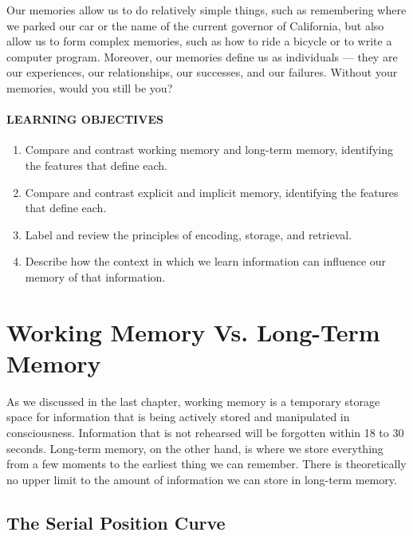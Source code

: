 \documentclass[
]{krantz}
\providecommand{\tightlist}{%
  \setlength{\itemsep}{0pt}\setlength{\parskip}{0pt}}
\begin{document}
Our memories allow us to do relatively simple things, such as remembering where we parked our car or the name of the current governor of California, but also allow us to form complex memories, such as how to ride a bicycle or to write a computer program. Moreover, our memories define us as individuals --- they are our experiences, our relationships, our successes, and our failures. Without your memories, would you still be you?

\hypertarget{learning-objectives-4}{%
\paragraph*{LEARNING OBJECTIVES}\label{learning-objectives-4}}

\begin{enumerate}
\def\labelenumi{\arabic{enumi}.}
\tightlist
\item
  Compare and contrast working memory and long-term memory, identifying the features that define each.
\item
  Compare and contrast explicit and implicit memory, identifying the features that define each.
\item
  Label and review the principles of encoding, storage, and retrieval.
\item
  Describe how the context in which we learn information can influence our memory of that information.
\end{enumerate}

\hypertarget{working-memory-vs.-long-term-memory}{%
\section{Working Memory Vs. Long-Term Memory}\label{working-memory-vs.-long-term-memory}}

As we discussed in the last chapter, working memory is a temporary storage space for information that is being actively stored and manipulated in consciousness. Information that is not rehearsed will be forgotten within 18 to 30 seconds. Long-term memory, on the other hand, is where we store everything from a few moments to the earliest thing we can remember. There is theoretically no upper limit to the amount of information we can store in long-term memory.

\hypertarget{the-serial-position-curve}{%
\subsection*{The Serial Position Curve}\label{the-serial-position-curve}}
\end{document}
